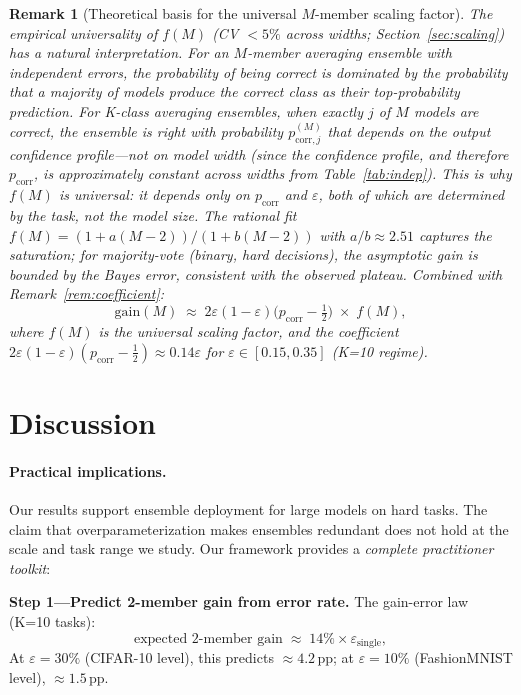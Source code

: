 \documentclass[11pt]{article}
\newtheorem{remark}{Remark}
\begin{document}
\begin{remark}[Theoretical basis for the universal $M$-member scaling factor]
\label{rem:mscaling}
The empirical universality of $f(M)$ (CV $< 5\%$ across widths;
Section~\ref{sec:scaling}) has a natural interpretation.  For an
$M$-member averaging ensemble with independent errors, the probability of
being correct is dominated by the probability that a majority of models
produce the correct class as their top-probability prediction.  For
K-class averaging ensembles, when exactly $j$ of $M$ models are correct,
the ensemble is right with probability $p_{\mathrm{corr},j}^{(M)}$ that
depends on the output confidence profile---not on model width (since the
confidence profile, and therefore $p_{\mathrm{corr}}$, is approximately
constant across widths from Table~\ref{tab:indep}).  This is why $f(M)$
is universal: it depends only on $p_{\mathrm{corr}}$ and $\varepsilon$,
both of which are determined by the task, not the model size.  The rational
fit $f(M) = (1+a(M-2))/(1+b(M-2))$ with $a/b \approx 2.51$ captures the
saturation; for majority-vote (binary, hard decisions), the asymptotic gain
is bounded by the Bayes error, consistent with the observed plateau.
Combined with Remark~\ref{rem:coefficient}:
\[
  \mathrm{gain}(M) \;\approx\; 2\varepsilon(1-\varepsilon)
  \bigl(p_{\mathrm{corr}} - \tfrac{1}{2}\bigr) \;\times\; f(M),
\]
where $f(M)$ is the universal scaling factor, and the coefficient
$2\varepsilon(1-\varepsilon)(p_{\mathrm{corr}}-\tfrac{1}{2}) \approx 0.14\varepsilon$
for $\varepsilon \in [0.15, 0.35]$ (K=10 regime).
\end{remark}

\section{Discussion}
\label{sec:discussion}

\paragraph{Practical implications.}
Our results support ensemble deployment for large models on hard tasks.
The claim that overparameterization makes ensembles redundant does not
hold at the scale and task range we study.  Our framework provides a
\emph{complete practitioner toolkit}:

\textbf{Step 1---Predict 2-member gain from error rate.}
The gain-error law (K=10 tasks):
\[
  \text{expected 2-member gain} \;\approx\; 14\% \times \varepsilon_{\mathrm{single}},
\]
At $\varepsilon = 30\%$ (CIFAR-10 level), this predicts ${\approx}4.2$\,pp;
at $\varepsilon = 10\%$ (FashionMNIST level), ${\approx}1.5$\,pp.
\end{document}
